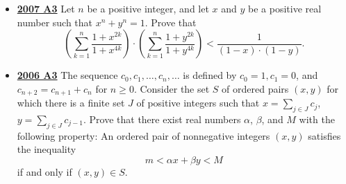 \documentclass[11pt]{scrartcl}
\begin{document}
\begin{itemize}[leftmargin=*]
\begin{enumerate}[(i)]
    \item Both functions are strictly increasing, i.e. $ f(x) < f(y)$ and $ g(x) < g(y)$ for all $ x$, $ y\in S$ with $ x < y$;
    \item The inequality $ f\left(g\left(g\left(x\right)\right)\right) < g\left(f\left(x\right)\right)$ holds for all $ x\in S$.
\end{enumerate}



Decide whether there exists a Spanish Couple
on the set $ S = \mathbb{N}$ of positive integers;
on the set $ S = \{a - \frac {1}{b}: a, b\in\mathbb{N}\}$
\item \href{https://artofproblemsolving.com/community/c6h214703p1187159}{\textbf{2007 A3}} Let $ n$ be a positive integer, and let $ x$ and $ y$ be a positive real number such that $ x^n + y^n = 1.$ Prove that
\[ \left(\sum^n_{k = 1} \frac {1 + x^{2k}}{1 + x^{4k}} \right) \cdot \left( \sum^n_{k = 1} \frac {1 + y^{2k}}{1 + y^{4k}} \right) < \frac {1}{(1 - x) \cdot (1 - y)}.
\]
\item \href{https://artofproblemsolving.com/community/c6h155689p874971}{\textbf{2006 A3}} The sequence $c_{0}, c_{1},\dots , c_{n}, \dots $ is defined by $c_{0}= 1, c_{1}= 0$, and $c_{n+2}= c_{n+1}+c_{n}$ for $n \geqslant  0$. Consider the set $S$ of ordered pairs $(x, y)$ for which there is a finite set $J$ of positive integers such that $x=\textstyle\sum_{j \in J}{c_{j}}$, $y=\textstyle\sum_{j \in J}{c_{j-1}}$. Prove that there exist real numbers $\alpha$, $\beta$, and $M$ with the following property: An ordered pair of nonnegative integers $(x, y)$ satisfies the inequality\[m < \alpha x+\beta y < M\]if and only if $(x, y) \in S$.
\end{itemize}
\newpage
\end{document}
